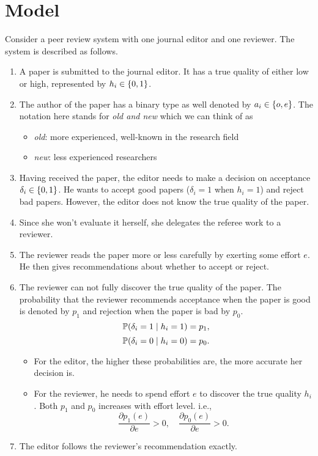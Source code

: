 \documentclass[12pt]{article}
\begin{document}
\section{Model} \label{sec:model}
Consider a peer review system with one journal editor and one reviewer. The
system is described as follows.
\begin{enumerate}
    \item A paper is submitted to the journal editor. It has a true quality of either low
          or high, represented by $h_i \in \left\{0,1\right\}$.
    \item The author of the paper has a binary type as well denoted by $a_i\in
              \left\{o,e\right\}$. The notation here stands for \textit{old and new} which we can
          think of as \begin{itemize}
              \item \textit{old}: more experienced, well-known in the research field
              \item \textit{new}: less experienced researchers
          \end{itemize}
    \item Having received the paper, the editor needs to make a decision on acceptance
          $\delta_i\in\left\{0,1\right\}$. He wants to accept good papers ($\delta_i=1$ when
          $h_i=1$) and reject bad papers. However, the editor does not know the true
          quality of the paper.
    \item Since she won't evaluate it herself, she delegates the referee work to a
          reviewer.
    \item The reviewer reads the paper more or less carefully by exerting some effort
          $e$. He then gives recommendations about whether to accept or reject.
    \item The reviewer can not fully discover the true quality of the paper. The
          probability that the reviewer recommends acceptance when the paper is good is
          denoted by $p_1$ and rejection when the paper is bad by $p_0$.
          \[
              \mathbb{P}(\delta_i = 1 \mid h_i = 1) = p_1,
          \]
          \[
              \mathbb{P}(\delta_i = 0 \mid h_i = 0) = p_0.
          \]
          \begin{itemize}
              \item For the editor, the higher these probabilities are, the more accurate her
                    decision is.
              \item For the reviewer, he needs to spend effort $e$ to discover the true quality
                    $h_i$. Both $p_1$ and $p_0$ increases with effort level. i.e.,
                    \[
                        \frac{\partial p_1(e)}{\partial e} > 0, \quad \frac{\partial p_0(e)}{\partial e} > 0.
                    \]
          \end{itemize}
    \item The editor follows the reviewer's recommendation exactly.
\end{enumerate}
\end{document}
